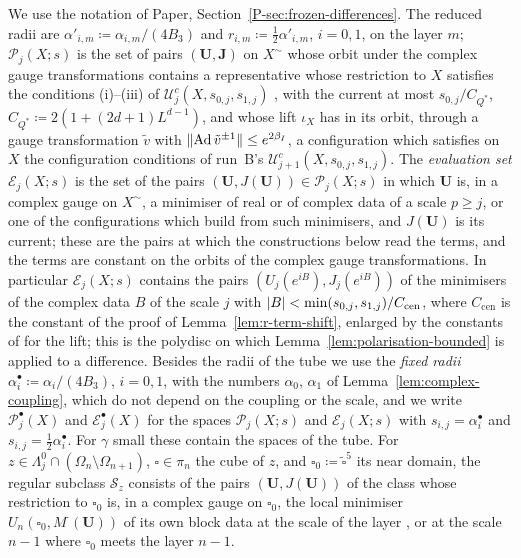 \documentclass[11pt]{preprint}
\DeclarePairedDelimiter{\abs}{\lvert}{\rvert}
\DeclarePairedDelimiter{\norm}{\lVert}{\rVert}
\numberwithin{equation}{section}
\theoremstyle{definition}
\theoremstyle{remark}
\theoremstyle{plain}
\begin{document}
We use the notation of Paper, Section~\ref{P-sec:frozen-differences}. The reduced radii are $\alpha'_{i,m} \coloneqq \alpha_{i,m}/(4B_3)$ and $r_{i,m} \coloneqq \frac12\alpha'_{i,m}$, $i = 0, 1$, on the layer $m$; $\mathcal P_j(X; s)$ is the set of pairs $(\mathbf U, \mathbf J)$ on $X^\sim$ whose orbit under the complex gauge transformations contains a representative whose restriction to $X$ satisfies the conditions (i)--(iii) of $\mathcal U^c_j(X, s_{0,j}, s_{1,j})$ \cite[p.~262]{BalabanRG1}, with the current at most $s_{0,j}/C_{Q^*}$, $C_{Q^*} \coloneqq 2(1 + (2d + 1)L^{d-1})$, and whose lift $\iota_X$ has in its orbit, through a gauge transformation $\tilde v$ with $\norm{\operatorname{Ad}\tilde v^{\pm1}} \leq e^{2\beta_I}$, a configuration which satisfies on $X$ the configuration conditions of run~B's $\mathcal U^c_{j+1}(X, s_{0,j}, s_{1,j})$. The \emph{evaluation set} $\mathcal E_j(X; s)$ is the set of the pairs $(\mathbf U, J(\mathbf U)) \in \mathcal P_j(X; s)$ in which $\mathbf U$ is, in a complex gauge on $X^\sim$, a minimiser of real or of complex data of a scale $p \geq j$, or one of the configurations which \cite[(3.13), (3.30)--(3.31)]{BalabanRG1} build from such minimisers, and $J(\mathbf U)$ is its current; these are the pairs at which the constructions below read the terms, and the terms are constant on the orbits of the complex gauge transformations. In particular $\mathcal E_j(X; s)$ contains the pairs $(U_j(e^{iB}), J_j(e^{iB}))$ of the minimisers of the complex data $B$ of the scale $j$ with $\abs B < \min(s_{0,j}, s_{1,j})/C_{\mathrm{cen}}$, where $C_{\mathrm{cen}}$ is the constant of the proof of Lemma~\ref{lem:r-term-shift}, enlarged by the constants of \cite[Proposition~9, (190), pp.~308--309]{BalabanVAR} for the lift; this is the polydisc on which Lemma~\ref{lem:polarisation-bounded} is applied to a difference. Besides the radii of the tube we use the \emph{fixed radii} $\alpha^\bullet_i \coloneqq \alpha_i/(4B_3)$, $i = 0, 1$, with the numbers $\alpha_0$, $\alpha_1$ of Lemma~\ref{lem:complex-coupling}, which do not depend on the coupling or the scale, and we write $\mathcal P^\bullet_j(X)$ and $\mathcal E^\bullet_j(X)$ for the spaces $\mathcal P_j(X; s)$ and $\mathcal E_j(X; s)$ with $s_{i,j} = \alpha^\bullet_i$ and $s_{i,j} = \frac12\alpha^\bullet_i$. For $\gamma$ small these contain the spaces of the tube. For $z \in \Lambda^0_j \cap (\Omega_n \setminus \Omega_{n+1})$, $\square \in \pi_n$ the cube of $z$, and $\square_0 \coloneqq \tilde\square^5$ its near domain, the regular subclass $\mathcal S_z$ consists of the pairs $(\mathbf U, J(\mathbf U))$ of the class whose restriction to $\square_0$ is, in a complex gauge on $\square_0$, the local minimiser $U_n(\square_0, M^\cdot(\mathbf U))$ of its own block data at the scale of the layer \cite[p.~273, ll.~39--42; p.~275, ll.~4--7]{BalabanRG1}, or at the scale $n - 1$ where $\square_0$ meets the layer $n - 1$.
\end{document}
